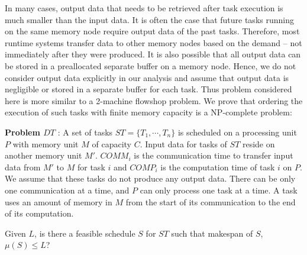 \documentclass[sigconf]{acmart}
\begin{document}
	
	In many cases, output data that needs to be retrieved after task execution is much smaller than the input data. It is often the case that future tasks running on the same memory node require output data of the past tasks. Therefore, most runtime systems transfer data to other memory nodes based on the demand -- not immediately after they were produced. It is also possible that all output data can be stored in a preallocated separate buffer on a memory node. Hence, we do not consider output data explicitly in our analysis and assume that output data is negligible or stored in a separate buffer for each task. Thus problem considered here is more similar to a 2-machine flowshop problem. We prove that ordering the execution of such tasks with finite memory capacity is a NP-complete problem: %
	
	
	\noindent\textbf{Problem $DT$} : A set of tasks $ST=\{T_1,
	\cdots, T_n\}$ is scheduled on a processing unit $P$ with
	memory unit $M$ of capacity $C$. Input data for tasks of $ST$
	reside on another memory unit $M'$. $COMM_i$ is the communication time to
	transfer input data from $M'$ to $M$ for task $i$ and $COMP_i$
	is the computation time of task $i$ on $P$. We assume that these
	tasks do not produce any output data. There can be only one
	communication at a time, and $P$ can only process one task at
	a time. A task uses an amount of memory in  $M$ from the
	start of its communication to the end of its computation.
	
	\noindent Given $L$, is there a feasible schedule $S$ for $ST$ such that
	makespan of $S$, $\mu(S) \le L$?
	
\end{document}
